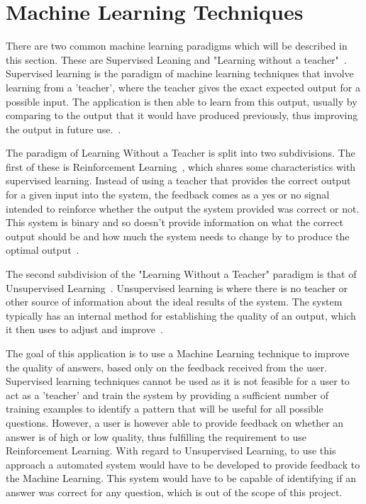 \documentclass[authoryearcitations]{UoYCSproject}
\begin{document}

\section{Machine Learning Techniques}

There are two common machine learning paradigms which will be described in this section. These are Supervised Leaning and "Learning without a teacher"~\cite{haykin1999neural}. Supervised learning is the paradigm of machine learning techniques that involve learning from a 'teacher', where the teacher gives the exact expected output for a possible input. The application is then able to learn from this output, usually by comparing to the output that it would have produced previously, thus improving the output in future use.~\cite{incaLecture}.

The paradigm of Learning Without a Teacher is split into two subdivisions. The first of these is Reinforcement Learning~\cite{haykin1999neural}, which shares some characteristics with supervised learning. Instead of using a teacher that provides the correct output for a given input into the system, the feedback comes as a yes or no signal intended to reinforce whether the output the system provided was correct or not. This system is binary and so doesn't provide information on what the correct output should be and how much the system needs to change by to produce the optimal output~\cite{incaLecture}.

The second subdivision of the "Learning Without a Teacher" paradigm is that of Unsupervised Learning~\cite{haykin1999neural}. Unsupervised learning is where there is no teacher or other source of information about the ideal results of the system. The system typically has an internal method for establishing the quality of an output, which it then uses to adjust and improve~\cite{incaLecture}.

The goal of this application is to use a Machine Learning technique to improve the quality of answers, based only on the feedback received from the user. Supervised learning techniques cannot be used as it is not feasible for a user to act as a 'teacher' and train the system by providing a sufficient number of training examples to identify a pattern that will be useful for all possible questions. However, a user is however able to provide feedback on whether an answer is of high or low quality, thus fulfilling the requirement to use Reinforcement Learning. With regard to Unsupervised Learning, to use this approach a automated system would have to be developed to provide feedback to the Machine Learning. This system would have to be capable of identifying if an answer was correct for any question, which is out of the scope of this project. 
\end{document}
